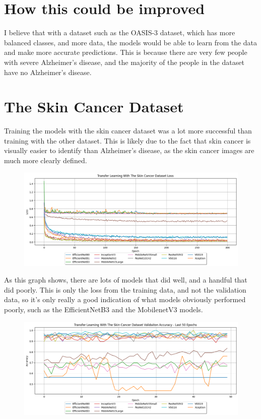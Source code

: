 \documentclass[]{final_report}
\begin{document}
\pagebreak

\section{How this could be improved}

I believe that with a dataset such as the OASIS-3 dataset, which has more balanced classes, and more data, the models would be able to learn from the data and make more accurate predictions. This is because there are very few people with severe Alzheimer's disease, and the majority of the people in the dataset have no Alzheimer's disease.



\section{The Skin Cancer Dataset}
Training the models with the skin cancer dataset was a lot more successful than training with the other dataset. This is likely due to the fact that skin cancer is visually easier to identify than Alzheimer's disease, as the skin cancer images are much more clearly defined.

\begin{figure}[ht!]
  \centering
  \includegraphics[width=1\textwidth]{images/skin-cancer-loss.png}
\end{figure}

As this graph shows, there are lots of models that did well, and a handful that did poorly. This is only the loss from the training data, and not the validation data, so it's only really a good indication of what models obviously performed poorly, such as the EfficientNetB3 and the MobilenetV3 models.

\pagebreak

\begin{figure}[ht!]
  \centering
  \includegraphics[width=1\textwidth]{images/skin-cancer-validation-accuracy-last-50.png}
\end{figure}
\end{document}

